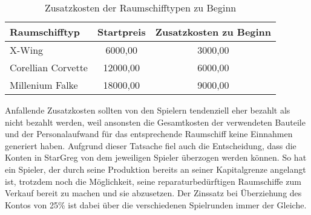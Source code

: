 \begin{table}[ht]\small
     \centering
     \begin{tabular}{ | l | c | c | }
          \hline
          Raumschifftyp & Startpreis & Zusatzkosten zu Beginn \\
          \hline \hline
          X-Wing &  6000,00\curr{} & 3000,00\curr{}\\ \hline
          Corellian Corvette & 12000,00\curr{} & 6000,00\curr{}\\ \hline
          Millenium Falke & 18000,00\curr{} & 9000,00\curr{} \\
          \hline
     \end{tabular}
     \caption{Zusatzkosten der Raumschifftypen zu Beginn}
     \label{tab:spielwelt-datenbasis-raumschiffe-zusammensetzung-2}
\end{table}

Anfallende Zusatzkosten sollten von den Spielern tendenziell eher bezahlt als nicht bezahlt werden, weil ansonsten die Gesamtkosten der verwendeten Bauteile und der Personalaufwand für das entsprechende Raumschiff keine Einnahmen generiert haben. Aufgrund dieser Tatsache fiel auch die Entscheidung, dass die Konten in StarGreg von dem jeweiligen Spieler überzogen werden können. So hat ein Spieler, der durch seine Produktion bereits an seiner Kapitalgrenze angelangt ist, trotzdem noch die Möglichkeit, seine reparaturbedürftigen Raumschiffe zum Verkauf bereit zu machen und sie abzusetzen. Der Zinssatz bei Überziehung des Kontos von 25\% ist dabei über die verschiedenen Spielrunden immer der Gleiche.




